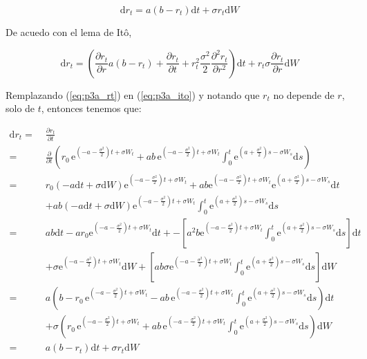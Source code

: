 \documentclass{tufte-handout}
\begin{document}
\begin{equation} \label{eq:p3a_drt}
	\mathrm{d}r_t = a(b-r_t)\mathrm{d}t + \sigma r_t \mathrm{d} W
\end{equation}

De acuedo con el lema de Itô,

\begin{equation} \label{eq:p3a_ito}
	\mathrm{d}r_t = \left( \frac{\partial r_t}{\partial r} a(b-r_t) +
							\frac{\partial r_t}{\partial t} +
							 r_t^2 \frac{\sigma^2}{2} \frac{\partial^2 r_t}{\partial r^2} \right) \mathrm{d}t
					+ r_t \sigma \frac{\partial r_t}{\partial r} \mathrm{d}W
\end{equation}

Remplazando (\ref{eq:p3a_rt}) en (\ref{eq:p3a_ito}) y notando que $r_t$ no depende de $r$, solo de $t$, entonces tenemos que:

\begin{align*}
	\mathrm{d}r_t =\; & \frac{\partial r_t}{\partial t} \\
				  =\; & \frac{\partial}{\partial t} \left(r_0 \, \mathrm{e}^{(-a - \frac{\sigma^2}{2}) t + \sigma W_t}
			+ ab \, \mathrm{e}^{(-a - \frac{\sigma^2}{2}) t + \sigma W_t}
			\int_0^t
				\mathrm{e}^{(a + \frac{\sigma^2}{2}) s - \sigma W_s}
			\mathrm{d}s \right) \\
			=\; & r_0 (-a \mathrm{d}t + \sigma \mathrm{d}W)\mathrm{e}^{(-a - \frac{\sigma^2}{2}) t + \sigma W_t} + ab\mathrm{e}^{(-a - \frac{\sigma^2}{2}) t + \sigma W_t} \mathrm{e}^{(a + \frac{\sigma^2}{2}) s - \sigma W_s} \mathrm{d}t \\
			& + ab (-a \mathrm{d}t + \sigma \mathrm{d}W)\mathrm{e}^{(-a - \frac{\sigma^2}{2}) t + \sigma W_t}\int_0^t
				\mathrm{e}^{(a + \frac{\sigma^2}{2}) s - \sigma W_s}
			\mathrm{d}s \\
			=\; & ab \mathrm{d}t - a r_0 \mathrm{e}^{(-a - \frac{\sigma^2}{2}) t + \sigma W_t} \mathrm{d}t + - \left[a^2 b \mathrm{e}^{(-a - \frac{\sigma^2}{2}) t + \sigma W_t}\int_0^t
				\mathrm{e}^{(a + \frac{\sigma^2}{2}) s - \sigma W_s}
			\mathrm{d}s \right] \mathrm{d}t \\
			& + \sigma \mathrm{e}^{(-a - \frac{\sigma^2}{2}) t + \sigma W_t} \mathrm{d}W + \left[ ab \sigma \mathrm{e}^{(-a - \frac{\sigma^2}{2}) t + \sigma W_t}\int_0^t
				\mathrm{e}^{(a + \frac{\sigma^2}{2}) s - \sigma W_s}
			\mathrm{d}s \right] \mathrm{d}W \\
			=\; & a(b-r_0 \, \mathrm{e}^{(-a - \frac{\sigma^2}{2}) t + \sigma W_t} - ab \, \mathrm{e}^{(-a - \frac{\sigma^2}{2}) t + \sigma W_t}
			\int_0^t
				\mathrm{e}^{(a + \frac{\sigma^2}{2}) s - \sigma W_s}
			\mathrm{d}s) \mathrm{d}t \\
			& + \sigma (r_0 \, \mathrm{e}^{(-a - \frac{\sigma^2}{2}) t + \sigma W_t}
			+ ab \, \mathrm{e}^{(-a - \frac{\sigma^2}{2}) t + \sigma W_t}
			\int_0^t
				\mathrm{e}^{(a + \frac{\sigma^2}{2}) s - \sigma W_s}
			\mathrm{d}s) \mathrm{d}W \\
			=\; & a(b-r_t)\mathrm{d}t + \sigma r_t \mathrm{d} W
\end{align*}
\end{document}
